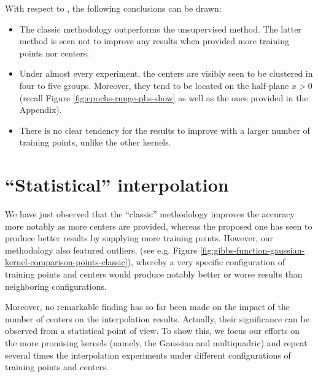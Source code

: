 \documentclass[12pt]{report} %
\newcommand{\tmverbatim}[1]{\text{{\ttfamily{#1}}}}
\begin{document}
With respect to \tmverbatim{phs\_kernel}, the following conclusions can be
drawn:
\begin{itemize}
  \item The classic methodology outperforms the unsupervised method. The
        latter method is seen not to improve any results when provided more training
        points nor centers.

  \item Under almost every experiment, the centers are visibly seen to be
        clustered in four to five groups. Moreover, they tend to be located on the
        half-plane $x > 0$ (recall Figure \ref{fig:epochs-runge-phs-show} as well as
        the ones provided in the Appendix).

  \item There is no clear tendency for the results to improve with a larger
        number of training points, unlike the other kernels. %
\end{itemize}


\clearpage
\section*{``Statistical'' interpolation}

We have just observed that the ``classic'' methodology improves the accuracy
more notably as more centers are provided,
whereas the proposed one has seen to produce better results by supplying more
training points. However, our methodology also featured outliers,
(see e.g. Figure \ref{fig:gibbs-function-gaussian-kernel-comparison-points-classic}),
whereby a very specific configuration of training points and centers would
produce notably better or worse results than neighboring configurations.

Moreover, no remarkable finding has so far been made on the impact of the number of
centers on the interpolation results. Actually, their significance can be
observed from a statistical point of view. To show this, we focus our efforts on
the more promising kernels (namely, the Gaussian and multiquadric) and repeat several
times the interpolation experiments under different configurations of
training points and centers.
\end{document}
